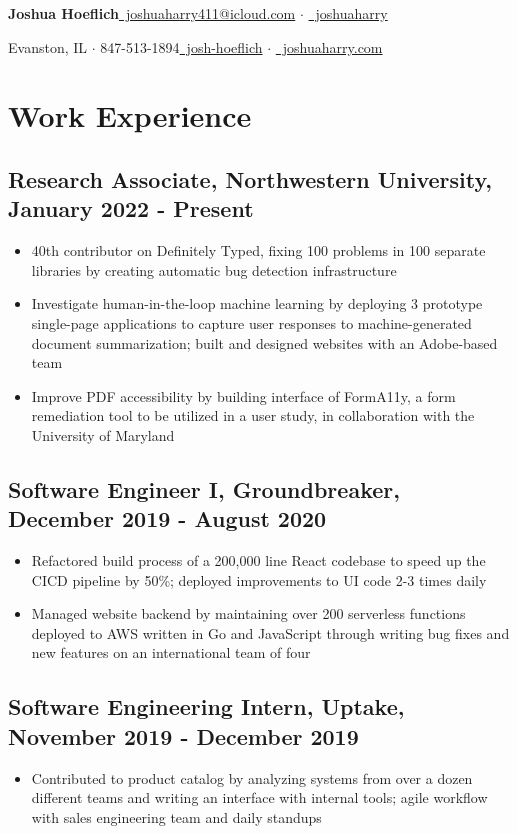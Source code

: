 \documentclass[letterpaper]{article}
\newcommand{\bigdot}{{\large $\cdot$ }}
\begin{document}
{\Large \textbf{Joshua Hoeflich}}\hfill \href{mailto:joshuahoeflich2021@u.northwestern.edu}{{\small \faEnvelope}~joshuaharry411@icloud.com} \bigdot
\href{https://github.com/joshuaharry}{{\small \faGithub}~joshuaharry}

{\normalsize Evanston, IL $\cdot$ 847-513-1894}\hfill \href{https://www.linkedin.com/in/josh-hoeflich/}{{\small \faLinkedinSquare}~josh-hoeflich} $\cdot$ \href{https://joshuaharry.com}{{\small \faGlobe}~joshuaharry.com}
\section*{Work Experience}
\subsection*{Research Associate, Northwestern University, January 2022 - Present}
\begin{itemize}
\item 40th contributor on Definitely Typed, fixing 100 problems in 100 separate libraries by creating automatic bug detection infrastructure
\item Investigate human-in-the-loop machine learning by deploying 3 prototype single-page applications to capture user responses to machine-generated document summarization; built and designed websites with an Adobe-based team
\item Improve PDF accessibility by building interface of FormA11y, a form remediation tool to be utilized in a user study, in collaboration with the University of Maryland
\end{itemize}
\subsection*{Software Engineer I, Groundbreaker, December 2019 - August 2020}
\begin{itemize}
\item Refactored build process of a 200,000 line React codebase to speed up the CICD pipeline by 50\%; deployed improvements to UI code 2-3 times daily
\item Managed website backend by maintaining over 200 serverless functions deployed to AWS written in Go and JavaScript through writing bug fixes and new features on an international team of four
\end{itemize}
\subsection*{Software Engineering Intern, Uptake, November 2019 - December 2019}
\begin{itemize}
  \item Contributed to product catalog by analyzing systems from over a dozen different teams and writing an interface with internal tools; agile workflow with sales engineering team and daily standups
\end{itemize}
\end{document}
